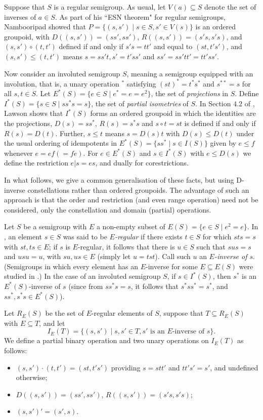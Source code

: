 \documentclass[12pt]{amsart}
\theoremstyle{definition}
\newcommand{\bi}{\begin{itemize}}
\newcommand{\ei}{\end{itemize}}
\begin{document}
Suppose that $S$ is a regular semigroup.  As usual, let $V(a)\subseteq S$ denote the set of inverses of $a\in S$.  As part of his ``ESN theorem" for regular semigroups, Nambooripad showed that $P=\{(s,s')\mid s\in S,s'\in V(s)\}$ is an ordered groupoid, with $D((s,s'))=(ss',ss')$, $R((s,s'))=(s's,s's)$, and $(s,s')\circ (t,t')$ defined if and only if $s's=tt'$ and equal to $(st,t's')$, and $(s,s')\leq (t,t')$ means $s=ss't, s'=t'ss'$ and $ss'=ss'tt'=tt'ss'$.

Now consider an involuted semigroup $S$, meaning a semigroup equipped with an involution, that is, a unary operation $^*$ satisfying $(st)^*=t^*s^*$ and $s^{**}=s$ for all $s,t\in S$.  Let $E^*(S)=\{e\in S\mid e^*=e=e^2\}$, the set of {\em projections} in $S$.  Define $I^*(S)=\{s\in S\mid ss^*s=s\}$, the set of {\em partial isometries} of $S$.  In Section $4.2$ of \cite{lawsoninverse}, Lawson shows that $I^*(S)$ forms an ordered groupoid in which the identities are the projections, $D(s)=ss^*$, $R(s)=s^*s$ and $s\circ t=st$ is defined if and only if $R(s)=D(t)$. Further, $s\leq t$ means $s=D(s)t$ with $D(s)\leq D(t)$ under the usual ordering of idempotents in $E^*(S)=\{ss^*\mid s\in I(S)\}$ given by $e\leq f$ whenever $e=ef(=fe)$. For $e\in E^*(S)$ and $s\in I^*(S)$ with $e\leq D(s)$ we define the restriction $e|s=es$, and dually for corestrictions.  

In what follows, we give a common generalisation of these facts, but using D-inverse constellations rather than ordered groupoids.  The advantage of such an approach is that the order and restriction (and even range operation) need not be considered, only the constellation and domain (partial) operations. 

Let $S$ be a semigroup with $E$ a non-empty subset of $E(S)=\{e\in S\mid e^2=e\}$.  In \cite{GouldZenab}, an element $s\in S$ was said to be  {\em $E$-regular} if there exists $t\in S$ for which $sts=s$ with $st,ts\in E$; if $s$ is $E$-regular, it follows that there is $u\in S$ such that $sus=s$ and $usu=u$, with $su,us\in E$ (simply let $u=tst$).  Call such $u$ an {\em $E$-inverse of $s$}.  (Semigroups in which every element has an $E$-inverse for some $E\subseteq E(S)$ were studied in \cite{Dsemigen}.)  In the case of an involuted semigroup $S$, if $s\in I^*(S)$, then $s^*$ is an $E^*(S)$-inverse of $s$ (since from $ss^*s=s$, it follows that $s^*ss^*=s^*$, and $ss^*,s^*s\in E^*(S)$).
  
Let $R_E(S)$ be the set of $E$-regular elements of $S$, suppose that $T\subseteq R_E(S)$ with $E\subseteq T$, and let 
\[I_E(T)=\{(s,s')\mid s,s'\in T, s'\mbox{ is an $E$-inverse of }s\}.\] 
We define a partial binary operation and two unary operations on $I_E(T)$ as follows:
\bi
\item $(s,s')\cdot (t,t')=(st,t's')$ providing $s=stt'$ and $tt's'=s'$, and undefined otherwise; 
\item $D((s,s'))=(ss',ss')$, $R((s,s'))=(s's,s's)$;
\item $(s,s')'=(s',s)$.
\ei
\end{document}
